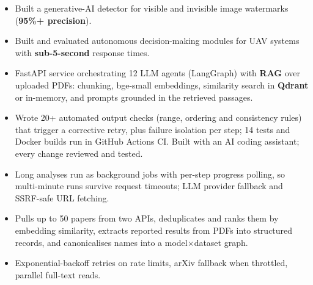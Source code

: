 \begin{itemize}
  \item Built a generative-AI detector for visible and invisible image watermarks (\textbf{95\%+ precision}).
\end{itemize}

\begin{itemize}
  \item Built and evaluated autonomous decision-making modules for UAV systems with \textbf{sub-5-second} response times.
\end{itemize}

\begin{itemize}
  \item FastAPI service orchestrating 12 LLM agents (LangGraph) with \textbf{RAG} over uploaded PDFs: chunking, bge-small embeddings, similarity search in \textbf{Qdrant} or in-memory, and prompts grounded in the retrieved passages.
  \item Wrote 20+ automated output checks (range, ordering and consistency rules) that trigger a corrective retry, plus failure isolation per step; 14 tests and Docker builds run in GitHub Actions CI. Built with an AI coding assistant; every change reviewed and tested.
  \item Long analyses run as background jobs with per-step progress polling, so multi-minute runs survive request timeouts; LLM provider fallback and SSRF-safe URL fetching.
\end{itemize}

\begin{itemize}
  \item Pulls up to 50 papers from two APIs, deduplicates and ranks them by embedding similarity, extracts reported results from PDFs into structured records, and canonicalises names into a model$\times$dataset graph.
  \item Exponential-backoff retries on rate limits, arXiv fallback when throttled, parallel full-text reads.
\end{itemize}

